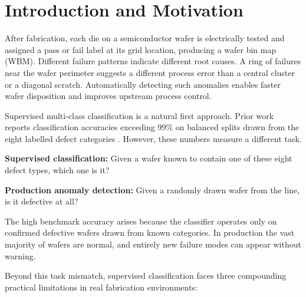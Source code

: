 \documentclass[11pt]{article}
\begin{document}
\newpage
\tableofcontents
\newpage


\section{Introduction and Motivation}
\label{sec:problem}

After fabrication, each die on a semiconductor wafer is electrically tested and
assigned a pass or fail label at its grid location, producing a wafer bin
map (WBM). Different failure patterns indicate different root causes. A ring of
failures near the wafer perimeter suggests a different process error than a central
cluster or a diagonal scratch. Automatically detecting such anomalies enables
faster wafer disposition and improves upstream process control.

Supervised multi-class classification is a natural first approach. Prior work
reports classification accuracies exceeding 99\% on balanced splits drawn from
the eight labelled defect categories \cite{khatun2026cbam, taha2025survey}.
However, these numbers measure a different task.

\begin{tcolorbox}[colback=blue!7!white, colframe=blue!45!white, boxsep=3pt, left=4pt, right=4pt, top=3pt, bottom=3pt]
\textbf{Supervised classification:} Given a wafer known to contain one of these eight defect types, which one is it?
\end{tcolorbox}

\begin{tcolorbox}[colback=orange!10!white, colframe=orange!55!white, boxsep=3pt, left=4pt, right=4pt, top=3pt, bottom=3pt]
\textbf{Production anomaly detection:} Given a randomly drawn wafer from the line, is it defective at all?
\end{tcolorbox}

The high benchmark accuracy arises because the
classifier operates only on confirmed defective wafers drawn from known categories.
In production the vast majority of wafers are normal, and entirely new failure
modes can appear without warning.

Beyond this task mismatch, supervised classification faces three compounding
practical limitations in real fabrication environments:
\end{document}
